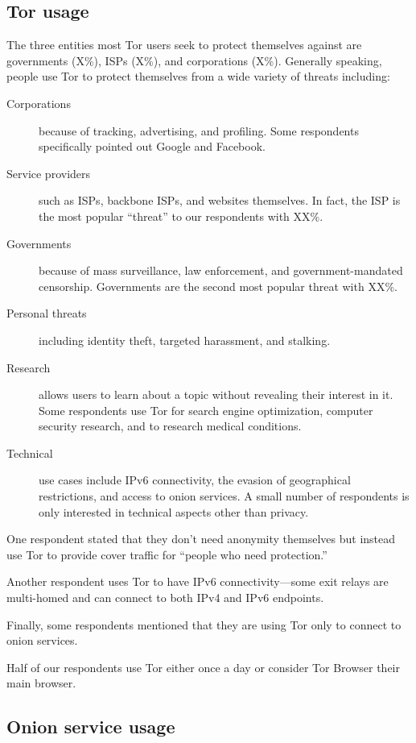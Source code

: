 \subsection{Tor usage}
The three entities most Tor users seek to protect themselves against are
governments (X\%), ISPs (X\%), and corporations (X\%).  Generally speaking,
people use Tor to protect themselves from a wide variety of threats including:
\begin{description}
    \item[Corporations] because of tracking, advertising, and profiling.  Some
        respondents specifically pointed out Google and Facebook.
    \item[Service providers] such as ISPs, backbone ISPs, and websites
        themselves.  In fact, the ISP is the most popular ``threat'' to our
        respondents with XX\%.
    \item[Governments] because of mass surveillance, law enforcement, and
        government-mandated censorship.  Governments are the second most
        popular threat with XX\%.
    \item[Personal threats] including identity theft, targeted harassment, and
        stalking.
    \item[Research] allows users to learn about a topic without revealing their
        interest in it.  Some respondents use Tor for search engine
        optimization, computer security research, and to research medical
        conditions.
    \item[Technical] use cases include IPv6 connectivity, the evasion of
        geographical restrictions, and access to onion services.  A small
        number of respondents is only interested in technical aspects other
        than privacy.
\end{description}

One respondent stated that they don't need anonymity themselves but instead use
Tor to provide cover traffic for ``people who need protection.''

Another respondent uses Tor to have IPv6 connectivity---some exit relays are
multi-homed and can connect to both IPv4 and IPv6 endpoints.

Finally, some respondents mentioned that they are using Tor only to connect to
onion services.

Half of our respondents use Tor either once a day or consider Tor Browser their
main browser.

\subsection{Onion service usage}
